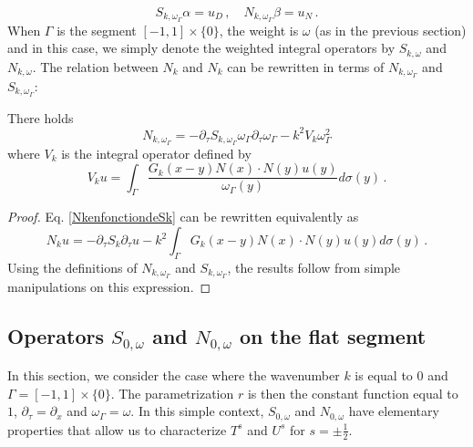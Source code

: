 \documentclass[a4paper]{article}
\begin{document}
\begin{equation}
\label{weightedBIEs}
	S_{k,\omega_\Gamma}\alpha = u_D\,, \quad N_{k,\omega_\Gamma}\beta = u_N\,.
\end{equation}
When $\Gamma$ is the segment $[-1,1]\times \{0\}$, the weight is $\omega$ (as in the previous section) and in this case, we simply denote the weighted integral operators  by $S_{k,\omega}$ and $N_{k,\omega}$. The relation between $N_k$ and $N_k$ can be rewritten in terms of $N_{k,\omega_\Gamma}$ and $S_{k,\omega_\Gamma}$:
\begin{Lem}
	\label{NkomegaSkomega}
	There holds 
	\[N_{k,\omega_\Gamma} = -\partial_\tau S_{k,\omega_\Gamma} \omega_\Gamma \partial_\tau \omega_\Gamma - k^2 V_k \omega_\Gamma^2\]
	where $V_k$ is the integral operator defined by 
	\[V_k u = \int_{\Gamma} \frac{G_k(x - y) N(x) \cdot N(y) u(y)}{\omega_\Gamma(y)} d\sigma(y)\,. \]
\end{Lem}
\begin{proof}
	Eq. \eqref{NkenfonctiondeSk} can be rewritten equivalently as 
	\[N_k u = -\partial_\tau S_k \partial_\tau u - k^2 \int_{\Gamma} G_k(x - y) N(x) \cdot N(y) u(y) d\sigma(y)\,. \]
	Using the definitions of $N_{k,\omega_\Gamma}$ and $S_{k,\omega_\Gamma}$, the results follow from simple manipulations on this expression. 
\end{proof}

\subsection{Operators $S_{0,\omega}$ and $N_{0,\omega}$ on the flat segment}

In this section, we consider the case where the wavenumber $k$ is equal to $0$ and $\Gamma = [-1,1]\times{\{0\}}$. The parametrization $r$ is then the constant function equal to $1$, $\partial_\tau = \partial_x$ and $\omega_\Gamma = \omega$. In this simple context, $S_{0,\omega}$ and $N_{0,\omega}$ have elementary properties that allow us to characterize $T^{s}$ and $U^s$ for $s = \pm \frac{1}{2}$. 
\end{document}
